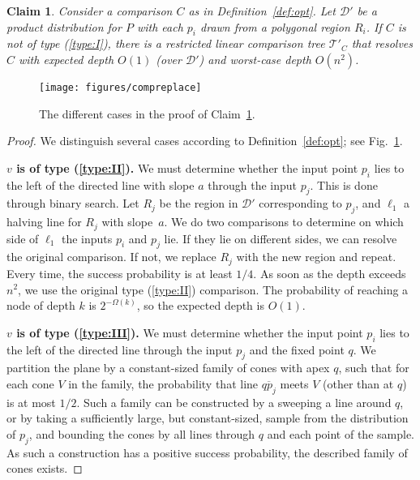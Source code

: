 \documentclass[letterpaper,11pt]{article}
\newtheorem{claim}[theorem]{Claim}
\newcommand{\cD}{\mathcal{D}}
\newcommand{\cT}{\mathcal{T}}
\begin{document}
\begin{claim} \label{clm:node} 
  Consider a comparison $C$ as 
  in Definition~\ref{def:opt}. 
  Let $\cD'$ be a product distribution 
  for $P$ with each $p_i$ drawn 
  from a polygonal region $R_i$. If $C$ is not of
  type \textup(\ref{type:I}\textup), there is
  a restricted linear comparison tree $\cT'_C$ 
  that resolves $C$ with expected depth 
  $O(1)$ (over $\cD'$) and worst-case
  depth $O(n^2)$.
\end{claim}
\begin{figure}
  \centering
  \texttt{[image: figures/compreplace]}
  \caption{The different cases in the proof of Claim~\ref{clm:node}.}
  \label{fig:compreplace}
\end{figure}
\begin{proof}
We distinguish several cases 
according to Definition~\ref{def:opt}; 
see Fig.~\ref{fig:compreplace}.

\noindent\textbf{$v$ is of type (\ref{type:II}).} 
We must determine 
whether the input point $p_i$ lies 
to the left of the directed line 
with slope $a$ 
through the input $p_j$.
This is done through binary search. 
Let $R_j$ be the region in 
$\cD'$ corresponding to $p_j$,  
and $\ell_1$ a halving line for 
$R_j$ with slope~$a$. We do 
two comparisons to determine 
on which side of $\ell_1$ the inputs 
$p_i$ and $p_j$ lie. If they
lie on different sides, 
we can resolve the original comparison.
If not, we replace 
$R_j$ with the new 
region and repeat. 
Every time, the success 
probability is at least $1/4$.
As soon as the depth exceeds
$n^2$, we use the original
type (\ref{type:II}) comparison.
The probability of reaching
a node of depth $k$ is 
$2^{-\Omega(k)}$, so the expected 
depth is $O(1)$. 
   
\noindent\textbf{$v$ is of type (\ref{type:III}).} 
We must determine whether 
the input point $p_i$ lies 
to the left of the directed line 
through the input $p_j$ 
and the fixed point $q$.
We partition the plane by a 
constant-sized family of cones
with apex $q$, such that 
for each cone $V$ in the family,
the probability that line 
$\overline{q p_j}$ meets $V$ 
(other than at $q$)
is at most $1/2$. Such 
a family can be 
constructed by a sweeping a 
line around $q$, or by
taking a sufficiently large, but 
constant-sized, sample from the 
distribution of $p_j$, and 
bounding the cones by all lines 
through $q$ and each point of 
the sample. As such a construction 
has a positive success probability,
the described family
of cones exists.
  

\end{proof}
\end{document}
